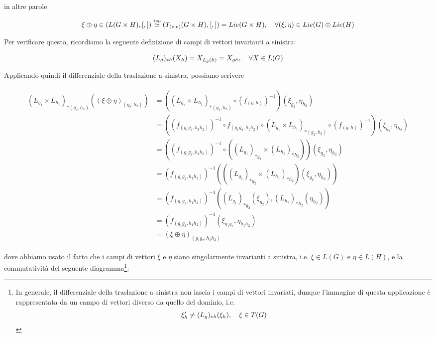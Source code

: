 in altre parole

\begin{gather}
	\xi \oplus \eta \in (L(G \times H),[,]) %
	\stackrel{iso}{\simeq} (T_{(e,e)}(G \times H),[,]) %
	= Lie(G \times H) %
	\qcomma \forall (\xi,\eta) \in Lie(G) \oplus Lie(H)
\end{gather}

Per verificare questo, ricordiamo la seguente definizione di campi di vettori invarianti a sinistra:

\begin{equation}
	(L_{g})_{*h}(X_{h}) = X_{L_{g}(h)} = X_{gh} \qcomma \forall X \in L(G)
\end{equation}

Applicando quindi il differenziale della traslazione a sinistra, possiamo scrivere

\begin{align}
	\begin{split}
		(L_{g_{1}} \times L_{h_{1}})_{*(g_{2},h_{2})} \left( (\xi \oplus \eta)_{(g_{2},h_{2})} \right) &= \left( (L_{g_{1}} \times L_{h_{1}})_{*(g_{2},h_{2})} \circ (f_{(g,h)})^{-1} \right) \left( \xi_{g_{2}}, \eta_{h_{2}} \right) \\
		&= \left( (f_{(g_{1} g_{2}, h_{1} h_{2})})^{-1} \circ f_{(g_{1} g_{2}, h_{1} h_{2})} \circ (L_{g_{1}} \times L_{h_{1}})_{*(g_{2},h_{2})} \circ (f_{(g,h)})^{-1} \right) \left( \xi_{g_{2}}, \eta_{h_{2}} \right) \\
		&= \left( (f_{(g_{1} g_{2}, h_{1} h_{2})})^{-1} \circ \left( (L_{g_{1}})_{*g_{2}} \times (L_{h_{1}})_{*h_{2}} \right) \right) \left( \xi_{g_{2}}, \eta_{h_{2}} \right) \\
		&= (f_{(g_{1} g_{2}, h_{1} h_{2})})^{-1} \left( \left( (L_{g_{1}})_{*g_{2}} \times (L_{h_{1}})_{*h_{2}} \right) \left( \xi_{g_{2}}, \eta_{h_{2}} \right) \right) \\
		&= (f_{(g_{1} g_{2}, h_{1} h_{2})})^{-1} \left( (L_{g_{1}})_{*g_{2}} (\xi_{g_{2}}), (L_{h_{1}})_{*h_{2}} (\eta_{h_{2}}) \right) \\
		&= (f_{(g_{1} g_{2}, h_{1} h_{2})})^{-1} \left( \xi_{g_{1} g_{2}}, \eta_{h_{1} h_{2}} \right) \\
		&= (\xi \oplus \eta)_{(g_{1} g_{2}, h_{1} h_{2})}
	\end{split}
\end{align}

dove abbiamo usato il fatto che i campi di vettori $ \xi $ e $ \eta $ siano singolarmente invarianti a sinistra, i.e. $ \xi \in L(G) $ e $ \eta \in L(H) $, e la commutatività del seguente diagramma\footnote{%
	In generale, il differenziale della traslazione a sinistra non lascia i campi di vettori invariati, dunque l'immagine di questa applicazione è rappresentata da un campo di vettori diverso da quello del dominio, i.e.
	\begin{equation*}
		\xi'_{h} \neq (L_{g})_{*h}(\xi_{h}) \qcomma \xi \in T(G)
	\end{equation*}%
}:

